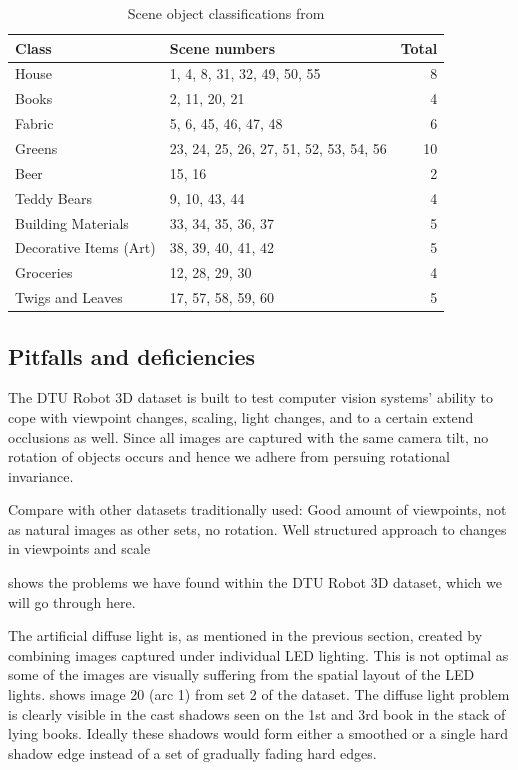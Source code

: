\documentclass[thesis.tex]{subfiles}
\begin{document}
\begin{table}[ht]
	\centering
	\begin{tabular}{l l r}
		\toprule
		Class & Scene numbers & Total \\
		\midrule
		House					& 1, 4, 8, 31, 32, 49, 50, 55				& 8 \\
		Books					& 2, 11, 20, 21								& 4 \\
		Fabric					& 5, 6, 45, 46, 47, 48						& 6 \\
		Greens					& 23, 24, 25, 26, 27, 51, 52, 53, 54, 56	& 10 \\
		Beer  					& 15, 16									& 2 \\
		Teddy Bears 			& 9, 10, 43, 44								& 4 \\
		Building Materials 		& 33, 34, 35, 36, 37						& 5 \\
		Decorative Items (Art) 	& 38, 39, 40, 41, 42						& 5 \\
		Groceries 				& 12, 28, 29, 30							& 4 \\
		Twigs and Leaves 		& 17, 57, 58, 59, 60 						& 5 \\
		\bottomrule
	\end{tabular}
	\caption{Scene object classifications from \cite[Table 1]{aanaes2010ground}}
	\label{tbl:dtu_scene_classifications}
\end{table}
%

\subsection{Pitfalls and deficiencies}
The DTU Robot 3D dataset is built to test computer vision systems' ability to cope with viewpoint changes, scaling, light changes, and to a certain extend occlusions as well. Since all images are captured with the same camera tilt, no rotation of objects occurs and hence we adhere from persuing rotational invariance.

Compare with other datasets traditionally used: Good amount of viewpoints, not as natural images as other sets, no rotation. Well structured approach to changes in viewpoints and scale

 shows the problems we have found within the DTU Robot 3D dataset, which we will go through here.

The artificial diffuse light is, as mentioned in the previous section, created by combining images captured under individual LED lighting. This is not optimal as some of the images are visually suffering from the spatial layout of the LED lights.  shows image 20 (arc 1) from set 2 of the dataset. The diffuse light problem is clearly visible in the cast shadows seen on the 1st and 3rd book in the stack of lying books. Ideally these shadows would form either a smoothed or a single hard shadow edge instead of a set of gradually fading hard edges.
\end{document}
